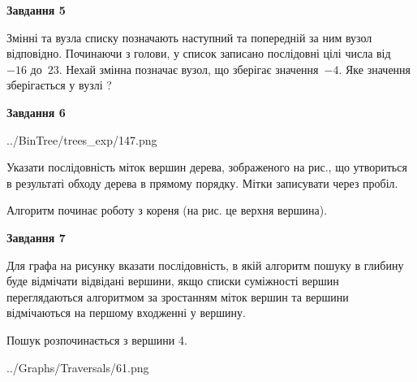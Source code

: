 \documentclass[12pt, ukrainian]{article}
\begin{document}
{\begin {large}
{\begin {center}\textbf{Завдання 5}\end {center}}\par
Змінні  та  вузла списку позначають наступний та попередній за ним вузол відповідно. Починаючи з голови, у список записано послідовні цілі числа від~$-16$ до~$23$. Нехай змінна  позначає вузол, що зберігає значення~$-4$.
Яке значення зберігається у вузлі  ?\par
\newpage

{\begin {center}\textbf{Завдання 6}\end {center}}\par

\begin{center}
	{../BinTree/trees_exp/147.png}
\end{center}
Указати послідовність міток вершин дерева, зображеного на рис., що утвориться в результаті обходу дерева в прямому порядку. Мітки записувати через пробіл.\par Алгоритм починає роботу з кореня (на рис. це верхня вершина).\par
\newpage

{\begin {center}\textbf{Завдання 7}\end {center}}\par
Для графа на рисунку вказати послідовність, в якій алгоритм пошуку в глибину буде відмічати відвідані вершини, якщо списки суміжності вершин переглядаються алгоритмом за зростанням міток вершин та вершини відмічаються на першому вход\-женні у вершину.\par
Пошук розпочинається з вершини 4.\par

\begin{center}
	{../Graphs/Traversals/61.png}
\end{center}\par
\newpage


\end{large}}
\end{document}
